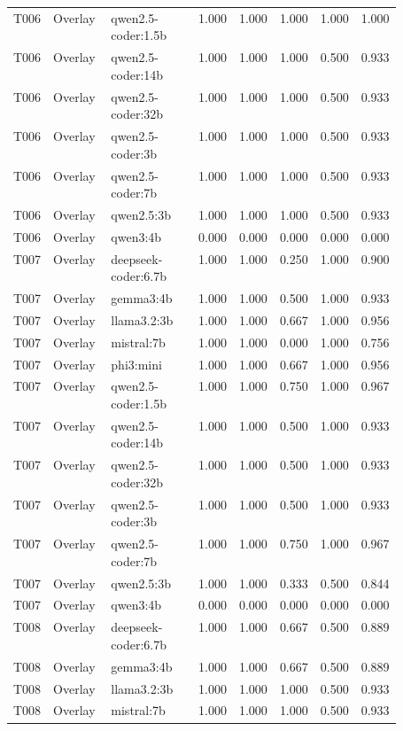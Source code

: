 \begin{longtable}{p{0.08\linewidth}p{0.16\linewidth}p{0.27\linewidth}rrrrr}
T006 & Overlay & qwen2.5-coder:1.5b & 1.000 & 1.000 & 1.000 & 1.000 & 1.000 \\
T006 & Overlay & qwen2.5-coder:14b & 1.000 & 1.000 & 1.000 & 0.500 & 0.933 \\
T006 & Overlay & qwen2.5-coder:32b & 1.000 & 1.000 & 1.000 & 0.500 & 0.933 \\
T006 & Overlay & qwen2.5-coder:3b & 1.000 & 1.000 & 1.000 & 0.500 & 0.933 \\
T006 & Overlay & qwen2.5-coder:7b & 1.000 & 1.000 & 1.000 & 0.500 & 0.933 \\
T006 & Overlay & qwen2.5:3b & 1.000 & 1.000 & 1.000 & 0.500 & 0.933 \\
T006 & Overlay & qwen3:4b & 0.000 & 0.000 & 0.000 & 0.000 & 0.000 \\
T007 & Overlay & deepseek-coder:6.7b & 1.000 & 1.000 & 0.250 & 1.000 & 0.900 \\
T007 & Overlay & gemma3:4b & 1.000 & 1.000 & 0.500 & 1.000 & 0.933 \\
T007 & Overlay & llama3.2:3b & 1.000 & 1.000 & 0.667 & 1.000 & 0.956 \\
T007 & Overlay & mistral:7b & 1.000 & 1.000 & 0.000 & 1.000 & 0.756 \\
T007 & Overlay & phi3:mini & 1.000 & 1.000 & 0.667 & 1.000 & 0.956 \\
T007 & Overlay & qwen2.5-coder:1.5b & 1.000 & 1.000 & 0.750 & 1.000 & 0.967 \\
T007 & Overlay & qwen2.5-coder:14b & 1.000 & 1.000 & 0.500 & 1.000 & 0.933 \\
T007 & Overlay & qwen2.5-coder:32b & 1.000 & 1.000 & 0.500 & 1.000 & 0.933 \\
T007 & Overlay & qwen2.5-coder:3b & 1.000 & 1.000 & 0.500 & 1.000 & 0.933 \\
T007 & Overlay & qwen2.5-coder:7b & 1.000 & 1.000 & 0.750 & 1.000 & 0.967 \\
T007 & Overlay & qwen2.5:3b & 1.000 & 1.000 & 0.333 & 0.500 & 0.844 \\
T007 & Overlay & qwen3:4b & 0.000 & 0.000 & 0.000 & 0.000 & 0.000 \\
T008 & Overlay & deepseek-coder:6.7b & 1.000 & 1.000 & 0.667 & 0.500 & 0.889 \\
T008 & Overlay & gemma3:4b & 1.000 & 1.000 & 0.667 & 0.500 & 0.889 \\
T008 & Overlay & llama3.2:3b & 1.000 & 1.000 & 1.000 & 0.500 & 0.933 \\
T008 & Overlay & mistral:7b & 1.000 & 1.000 & 1.000 & 0.500 & 0.933 \\

\end{longtable}
